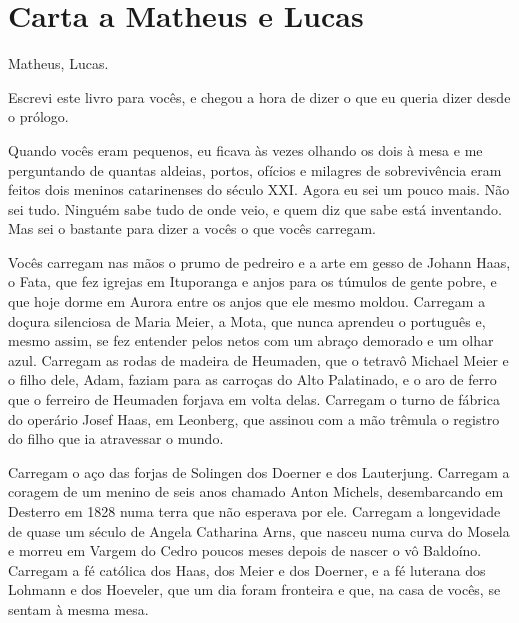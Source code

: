 \documentclass[
  brazilian,
  11pt,
  openany]{book}
\begin{document}
\section{Carta a Matheus e Lucas}\label{carta-a-matheus-e-lucas}

Matheus, Lucas.

Escrevi este livro para vocês, e chegou a hora de dizer o que eu queria
dizer desde o prólogo.

Quando vocês eram pequenos, eu ficava às vezes olhando os dois à mesa e
me perguntando de quantas aldeias, portos, ofícios e milagres de
sobrevivência eram feitos dois meninos catarinenses do século XXI. Agora
eu sei um pouco mais. Não sei tudo. Ninguém sabe tudo de onde veio, e
quem diz que sabe está inventando. Mas sei o bastante para dizer a vocês
o que vocês carregam.

Vocês carregam nas mãos o prumo de pedreiro e a arte em gesso de Johann
Haas, o Fata, que fez igrejas em Ituporanga e anjos para os túmulos de
gente pobre, e que hoje dorme em Aurora entre os anjos que ele mesmo
moldou. Carregam a doçura silenciosa de Maria Meier, a Mota, que nunca
aprendeu o português e, mesmo assim, se fez entender pelos netos com um
abraço demorado e um olhar azul. Carregam as rodas de madeira de
Heumaden, que o tetravô Michael Meier e o filho dele, Adam, faziam para
as carroças do Alto Palatinado, e o aro de ferro que o ferreiro de
Heumaden forjava em volta delas. Carregam o turno de fábrica do operário
Josef Haas, em Leonberg, que assinou com a mão trêmula o registro do
filho que ia atravessar o mundo.

Carregam o aço das forjas de Solingen dos Doerner e dos Lauterjung.
Carregam a coragem de um menino de seis anos chamado Anton Michels,
desembarcando em Desterro em 1828 numa terra que não esperava por ele.
Carregam a longevidade de quase um século de Angela Catharina Arns, que
nasceu numa curva do Mosela e morreu em Vargem do Cedro poucos meses
depois de nascer o vô Baldoíno. Carregam a fé católica dos Haas, dos
Meier e dos Doerner, e a fé luterana dos Lohmann e dos Hoeveler, que um
dia foram fronteira e que, na casa de vocês, se sentam à mesma mesa.
\end{document}
